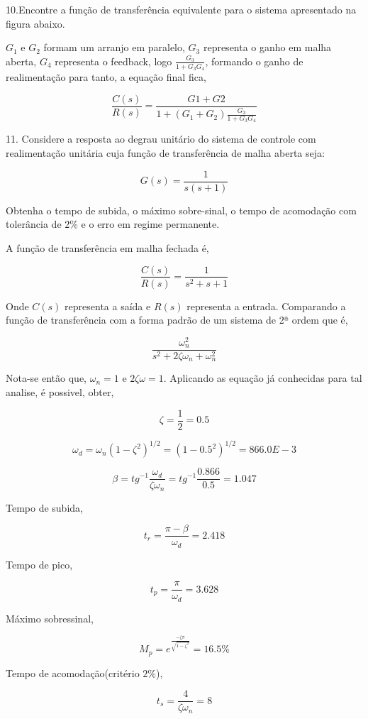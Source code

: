 \documentclass[paper=a4, fontsize=11pt]{article}
\begin{document}
10.Encontre a função de transferência equivalente para o sistema apresentado na figura
abaixo.

$G_1$ e $G_2$ formam um arranjo em paralelo, $G_3$ representa o ganho em malha aberta,
$G_4$ representa o feedback, logo $\frac{G_3}{1 + G_3 G_4}$, formando o ganho de realimentação
para tanto, a equação final fica,

$$
\frac{C(s)}{R(s)} = \frac{G1+G2}{1 + (G_1 + G_2)\frac{G_3}{1 + G_3 G_4}}
$$

\newpage

11. Considere a resposta ao degrau unitário do sistema de controle com realimentação 
unitária cuja função de transferência de malha aberta seja:

$$
G(s) = \frac{1}{s(s+1)}
$$

Obtenha o tempo de subida, o máximo sobre-sinal, o tempo de acomodação com tolerância de
$2\%$ e o erro em regime permanente.


A função de transferência em malha fechada é,

$$
\frac{C(s)}{R(s)} = \frac{1}{s^2 + s + 1}
$$

Onde $C(s)$ representa a saída e $R(s)$ representa a entrada. Comparando a função de 
transferência com a forma padrão de um sistema de 2ª ordem que é,

$$
\frac{\omega_n^2}{s^2 + 2 \zeta \omega_n + \omega_n^2}
$$

Nota-se então que, $\omega_n = 1$ e $2 \zeta \omega = 1$. Aplicando as equação já conhecidas
para tal analise, é possivel, obter,

$$
\zeta = \frac{1}{2} = 0.5
$$

$$
\omega_d = \omega_n (1-\zeta^2)^{1/2} = (1 - 0.5^2)^{1/2} = 866.0E-3
$$

$$
\beta = tg^{-1}{\frac{\omega_d}{\zeta \omega_n}} = tg^{-1}{\frac{0.866}{0.5}} = 1.047
$$

Tempo de subida,

$$
t_r = \frac{\pi - \beta}{\omega_d} = 2.418
$$

Tempo de pico,

$$
t_p = \frac{\pi}{\omega_d} = 3.628
$$

Máximo sobressinal,

$$
M_p = e^{\frac{-\zeta \pi}{\sqrt{1-\zeta^2}} } = 16.5 \%
$$

Tempo de acomodação(critério $2\%$),

$$
t_s = \frac{4}{\zeta \omega_n} = 8
$$
\end{document}
